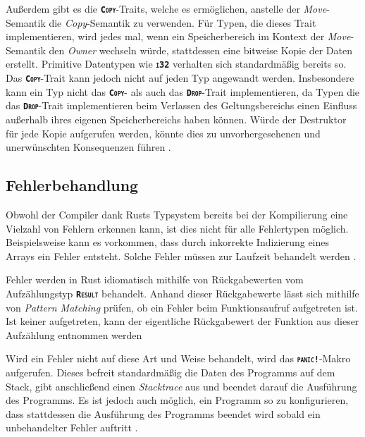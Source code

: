 Außerdem gibt es die \texttt{\textsc{\textbf{Copy}}}-Traits, welche es ermöglichen, anstelle der \textit{Move}-Semantik die
\textit{Copy}-Semantik zu verwenden. Für Typen, die dieses Trait implementieren, wird jedes mal, wenn ein
Speicherbereich im Kontext der \textit{Move}-Semantik den \textit{Owner} wechseln würde,
stattdessen eine bitweise Kopie der Daten erstellt. Primitive Datentypen wie \texttt{\textsc{\textbf{i32}}}
verhalten sich standardmäßig bereits so. Das \texttt{\textsc{\textbf{Copy}}}-Trait kann jedoch nicht auf jeden Typ
angewandt werden.
Insbesondere kann ein Typ nicht das \texttt{\textsc{\textbf{Copy}}}- als auch  das \texttt{\textsc{\textbf{Drop}}}-Trait implementieren,
da Typen die das \texttt{\textsc{\textbf{Drop}}}-Trait implementieren beim Verlassen des Geltungsbereichs einen Einfluss außerhalb ihres eigenen
Speicherbereichs haben können.
Würde der Destruktor für jede Kopie aufgerufen werden, könnte dies zu unvorhergesehenen und
unerwünschten Konsequenzen führen \cite{rustBook}\cite{rustDocCopy}.

\subsection{Fehlerbehandlung}\label{sec:error_handling}

Obwohl der Compiler dank Rusts Typsystem bereits bei der Kompilierung eine Vielzahl von Fehlern erkennen kann,
ist dies nicht für alle Fehlertypen möglich. Beispielsweise kann es vorkommen, dass
durch inkorrekte Indizierung eines Arrays ein Fehler entsteht.
Solche Fehler müssen zur Laufzeit behandelt werden \cite{rustBook}.

Fehler werden in Rust idiomatisch mithilfe von Rückgabewerten vom Aufzählungstyp \texttt{\textsc{\textbf{Result}}}
behandelt. Anhand dieser Rückgabewerte lässt sich mithilfe von
\textit{Pattern Matching} prüfen, ob ein Fehler beim Funktionsaufruf aufgetreten ist. Ist keiner aufgetreten,
kann der eigentliche Rückgabewert der Funktion aus dieser Aufzählung entnommen werden
\cite{rustBook}

Wird ein Fehler nicht auf diese Art und Weise behandelt, wird das \texttt{\textsc{\textbf{panic!}}}-Makro
aufgerufen. Dieses befreit standardmäßig die Daten des Programms auf dem Stack, gibt anschließend einen
\textit{Stacktrace} aus und beendet darauf die Ausführung des Programms.
Es ist jedoch auch möglich, ein Programm so zu konfigurieren,
dass stattdessen die Ausführung des Programms beendet wird sobald ein unbehandelter Fehler auftritt \cite{rustBook}.

